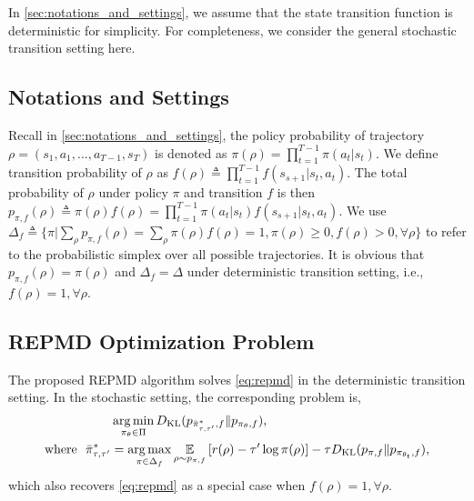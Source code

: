 In \cref{sec:notations_and_settings}, we assume that the state transition function is deterministic for simplicity. For completeness, we consider the general stochastic transition setting here.

\subsection{Notations and Settings}

Recall in \cref{sec:notations_and_settings}, the policy probability of trajectory $\rho=(s_1, a_1, \dots, a_{T-1}, s_T)$ is denoted as $\pi(\rho) = \prod_{t=1}^{T-1} \pi(a_t| s_t)$. We define transition probability of $\rho$ as $f(\rho) \triangleq \prod_{t=1}^{T-1}{ f(s_{s+1} | s_t, a_t)}$. The total probability of $\rho$ under policy $\pi$ and transition $f$ is then $p_{\pi, f}(\rho) \triangleq \pi(\rho) f(\rho) = \prod_{t=1}^{T-1}{ \pi(a_t | s_t) f(s_{s+1} | s_t, a_t)}$. We use $\Delta_{f} \triangleq \{ \pi | \sum_{\rho}{ p_{\pi, f}(\rho) } = \sum_{\rho}{\pi(\rho) f(\rho)} = 1, \pi(\rho) \ge 0, f(\rho) > 0, \forall \rho \}$ to refer to the probabilistic simplex over all possible trajectories. It is obvious that $p_{\pi, f}(\rho) = \pi(\rho)$ and $\Delta_f = \Delta$ under deterministic transition setting, i.e., $f(\rho) = 1, \forall \rho$.

\subsection{REPMD Optimization Problem}

The proposed REPMD algorithm solves \cref{eq:repmd} in the deterministic transition setting. In the stochastic setting, the corresponding problem is,
\begin{equation}
\label{eq:repmd_stochastic}
\begin{split}
	&\operatorname*{arg\,min}\limits_{\pi_\theta \in \Pi}{D_{\mathrm{KL}}(p_{\bar{\pi}_{\tau,\tau^{\prime}}^*, f}  \| p_{\pi_\theta, f} ) }, \\
	\text{where}\ \ \bar{\pi}_{\tau,\tau^{\prime}}^* & =  \operatorname*{arg\,max}\limits_{\pi \in \Delta_f}{ \operatorname*{\mathbb{E}}\limits_{\rho \sim p_{\pi, f}}{ \left[ r(\rho) - \tau^{\prime} \log{\pi(\rho)} \right] } - \tau D_{\mathrm{KL}}(p_{\pi, f} \| p_{\pi_{\theta_t}, f} ) },
\end{split}
\end{equation}
which also recovers \cref{eq:repmd} as a special case when $f(\rho) = 1, \forall \rho$.

